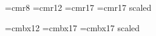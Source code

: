 









 


 

\font\small=cmr8
\font\large=cmr12
\font\Large=cmr17
\font\huge=cmr17 scaled 

\font\largebx=cmbx12
\font\Largebx=cmbx17
\font\hugebx=cmbx17 scaled 

